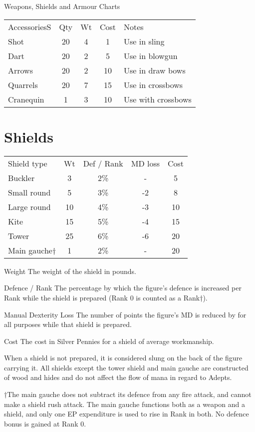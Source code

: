 \begin{Tables}{Weapons, Shields and Armour Charts}
\endgroup


\begin{tabularx}{\linewidth}{Xcccl}
AccessoriesS	& Qty	& Wt	& Cost	& Notes \\
Shot		& 20	& 4	& 1	& Use in sling \\
Dart		& 20	& 2	& 5	& Use in blowgun \\
Arrows		& 20	& 2	& 10	& Use in draw bows \\
Quarrels	& 20	& 7	& 15	& Use in crossbows \\
Cranequin	& 1	& 3	& 10	& Use with crossbows \\
\end{tabularx}


\section{Shields}

\begin{tabularx}{\linewidth}{Xcccc}
Shield type	& Wt	& Def / Rank	& MD loss	& Cost \\
Buckler		& 3	& 2\%		& -		& 5 \\
Small round	& 5	& 3\%		& -2		& 8 \\
Large round	& 10	& 4\%		& -3		& 10 \\
Kite 		& 15	& 5\%		& -4		& 15 \\
Tower		& 25	& 6\%		& -6		& 20 \\
Main gauche†	& 1	& 2\%		& -		& 20 \\
\end{tabularx}

Weight The weight of the shield in pounds. 
 
Defence / Rank The percentage by which the figure’s defence is
increased per Rank while the shield is prepared (Rank 0 is counted as
a Rank†).
 
Manual Dexterity Loss The number of points the figure’s MD is reduced
by for all purposes while that shield is prepared.

 
Cost The cost in Silver Pennies for a shield of average workmanship.
 

When a shield is not prepared, it is considered slung on the back of
the figure carrying it.  All shields except the tower shield and main
gauche are constructed of wood and hides and do not affect the flow of
mana in regard to Adepts.

†The main gauche does not subtract its defence from any fire attack,
and cannot make a shield rush attack. The main gauche functions both
as a weapon and a shield, and only one EP expenditure is used to rise
in Rank in both.  No defence bonus is gained at Rank 0.



\end{Tables}
